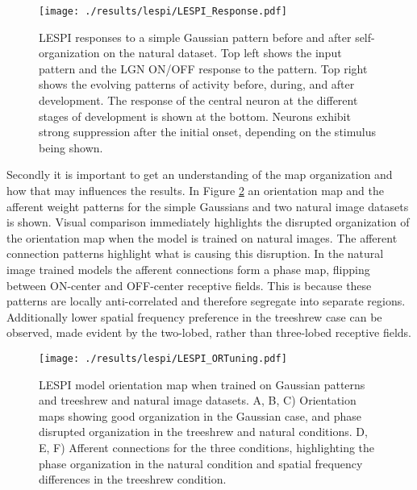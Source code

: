 \begin{figure}
	\centering
    \texttt{[image: ./results/lespi/LESPI\_Response.pdf]}
	\caption[LESPI responses to a simple Gaussian pattern before and
      after self-organization.]{LESPI responses to a simple Gaussian
      pattern before and after self-organization on the natural
      dataset. Top left shows the input pattern and the LGN ON/OFF
      response to the pattern. Top right shows the evolving patterns
      of activity before, during, and after development. The response
      of the central neuron at the different stages of development is
      shown at the bottom. Neurons exhibit strong suppression after
      the initial onset, depending on the stimulus being shown.}
	\label{LESPIResponse}
\end{figure}

Secondly it is important to get an understanding of the map
organization and how that may influences the results. In Figure
\ref{LESPI_ORTuning} an orientation map and the afferent weight
patterns for the simple Gaussians and two natural image datasets is
shown. Visual comparison immediately highlights the disrupted
organization of the orientation map when the model is trained on
natural images. The afferent connection patterns highlight what is
causing this disruption. In the natural image trained models the
afferent connections form a phase map, flipping between ON-center and
OFF-center receptive fields. This is because these patterns are
locally anti-correlated and therefore segregate into separate
regions. Additionally lower spatial frequency preference in the
treeshrew case can be observed, made evident by the two-lobed, rather
than three-lobed receptive fields.

\begin{figure}
	\centering
    \texttt{[image: ./results/lespi/LESPI\_ORTuning.pdf]}
	\caption[LESPI model orientation map when trained on Gaussian
      patterns and treeshrew and natural image datasets]{LESPI model
      orientation map when trained on Gaussian patterns and treeshrew
      and natural image datasets. A, B, C) Orientation maps showing
      good organization in the Gaussian case, and phase disrupted
      organization in the treeshrew and natural conditions. D, E, F)
      Afferent connections for the three conditions, highlighting the
      phase organization in the natural condition and spatial
      frequency differences in the treeshrew condition.}
	\label{LESPI_ORTuning}
\end{figure}


